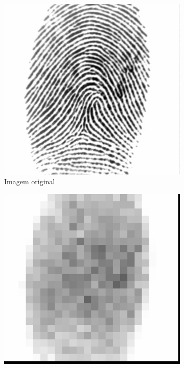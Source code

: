 \documentclass[10pt,a4paper]{article}
\begin{document}
\begin{figure}[!ht]
    \centering
    \begin{subfigure}[ht]{0.25\textwidth}
        \includegraphics[width=\textwidth]{Fingerprints/1_1_rgnl.jpg}
        \caption{Imagem original}
    \end{subfigure}
    \qquad
    \begin{subfigure}[ht]{0.25\textwidth}
        \includegraphics[width=\textwidth]{Fingerprints/1_1_mean.jpg}

\end{subfigure}
\end{figure}
\end{document}
